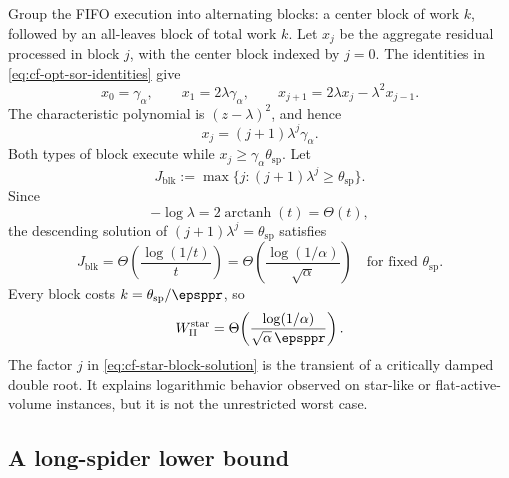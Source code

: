 Group the FIFO execution into alternating blocks: a center block of work
\(k\), followed by an all-leaves block of total work \(k\).  Let \(x_j\) be
the aggregate residual processed in block \(j\), with the center block indexed
by \(j=0\).  The identities in
\cref{eq:cf-opt-sor-identities} give
\begin{equation}
    x_0=\gamma_\alpha,
    \qquad
    x_1=2\lambda\gamma_\alpha,
    \qquad
    x_{j+1}=2\lambda x_j-\lambda^2x_{j-1}.
    \label{eq:cf-star-block-recurrence}
\end{equation}
The characteristic polynomial is \((z-\lambda)^2\), and hence
\begin{equation}
    x_j=(j+1)\lambda^j\gamma_\alpha.
    \label{eq:cf-star-block-solution}
\end{equation}
Both types of block execute while \(x_j\geq\gamma_\alpha \theta_{\mathrm{sp}}\).  Let
\begin{equation}
    J_{\mathrm{blk}}:=\max\{j:(j+1)\lambda^j\geq \theta_{\mathrm{sp}}\}.
    \label{eq:cf-star-J}
\end{equation}
Since
\begin{equation}
    -\log\lambda
    =2\operatorname{arctanh}(t)
    =\Theta(t),
    \label{eq:cf-lambda-log}
\end{equation}
the descending solution of
\((j+1)\lambda^j=\theta_{\mathrm{sp}}\) satisfies
\begin{equation}
    J_{\mathrm{blk}}
    =\Theta\!\left(
       \frac{\log(1/t)}{t}
      \right)
    =\Theta\!\left(
       \frac{\log(1/\alpha)}{\sqrt\alpha}
      \right)
    \quad\text{for fixed }\theta_{\mathrm{sp}}.
    \label{eq:cf-star-block-count}
\end{equation}
Every block costs \(k=\theta_{\mathrm{sp}}/\epsppr\), so
\begin{equation}
    W_{\rm II}^{\rm star}
    =\Theta\!\left(
       \frac{\log(1/\alpha)}
            {\sqrt\alpha\,\epsppr}
      \right).
    \label{eq:cf-star-log-lower}
\end{equation}
The factor \(j\) in \cref{eq:cf-star-block-solution} is the transient of a
critically damped double root.  It explains logarithmic behavior observed on
star-like or flat-active-volume instances, but it is not the unrestricted
worst case.

\subsection{A long-spider lower bound}
\label{subsec:cf-spider-lower}

